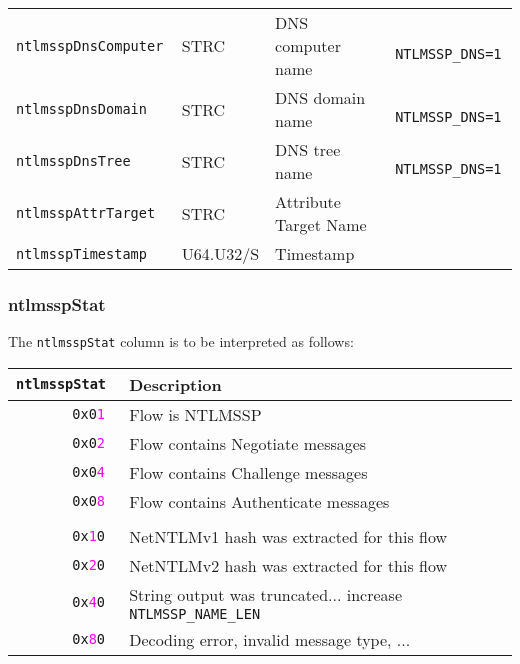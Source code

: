 \documentclass[documentation]{subfiles}
\begin{document}
\begin{longtable}{>{\tt}lll>{\tt\small}l}
    ntlmsspDnsComputer              & STRC         & DNS computer name             & NTLMSSP\_DNS=1\\
    ntlmsspDnsDomain                & STRC         & DNS domain name               & NTLMSSP\_DNS=1\\
    ntlmsspDnsTree                  & STRC         & DNS tree name                 & NTLMSSP\_DNS=1\\
    ntlmsspAttrTarget               & STRC         & Attribute Target Name         & \\
    ntlmsspTimestamp                & U64.U32/S    & Timestamp                     & \\
    \bottomrule
\end{longtable}

\subsubsection{ntlmsspStat}\label{ntlmsspStat}
The {\tt ntlmsspStat} column is to be interpreted as follows:
\begin{longtable}{>{\tt}rl}
    \toprule
    {\bf ntlmsspStat} & {\bf Description}\\
    \midrule\endhead%
    0x0\textcolor{magenta}{1} & Flow is NTLMSSP\\
    0x0\textcolor{magenta}{2} & Flow contains Negotiate messages\\
    0x0\textcolor{magenta}{4} & Flow contains Challenge messages\\
    0x0\textcolor{magenta}{8} & Flow contains Authenticate messages\\
    \\
    0x\textcolor{magenta}{1}0 & NetNTLMv1 hash was extracted for this flow\\
    0x\textcolor{magenta}{2}0 & NetNTLMv2 hash was extracted for this flow\\
    0x\textcolor{magenta}{4}0 & String output was truncated... increase {\tt NTLMSSP\_NAME\_LEN}\\
    0x\textcolor{magenta}{8}0 & Decoding error, invalid message type, ...\\
    \bottomrule
\end{longtable}
\end{document}
